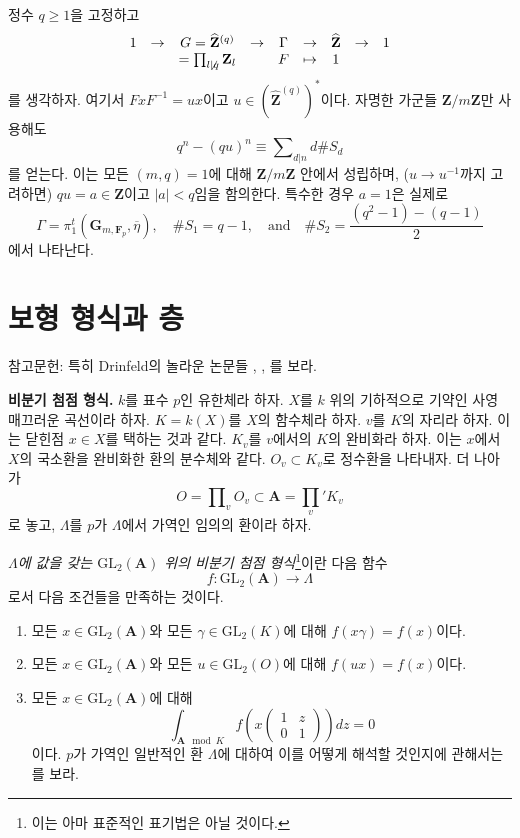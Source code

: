 \begin{example}
\label{example-commutative}
정수 $q\geq 1$을 고정하고
$$
\begin{matrix}
1 &
\to &
G = \widehat{\mathbf{Z}}^{(q)} &
\to &
\Gamma &
\to &
\widehat{\mathbf{Z}} &
\to &
1 \\
&
&
= \prod_{l\not \mid q} \mathbf{Z}_l &
&
F &
\mapsto &
1
\end{matrix}
$$
를 생각하자. 여기서 $FxF^{-1} = ux$이고
$u \in (\widehat{\mathbf{Z}}^{(q)})^*$이다.
자명한 가군들 $\mathbf{Z}/m\mathbf{Z}$만 사용해도
$$
q^n - (qu)^n \equiv \sum\nolimits_{d|n} d\# S_d
$$
를 얻는다. 이는 모든 $(m, q)=1$에 대해 $\mathbf{Z}/m\mathbf{Z}$ 안에서
성립하며, ($u \to u^{-1}$까지 고려하면) $qu = a\in \mathbf{Z}$이고
$|a| < q$임을 함의한다. 특수한 경우 $a = 1$은 실제로
$$
\Gamma = \pi_1^t(\mathbf{G}_{m, \mathbf{F}_p}, \overline \eta),
\quad
\# S_1 = q - 1,
\quad\text{and}\quad
\# S_2 = \frac{(q^2-1)-(q-1)}{2}
$$
에서 나타난다.
\end{example}



\section{보형 형식과 층}
\label{section-automorphic}

\noindent
참고문헌: 특히 Drinfeld의 놀라운 논문들
\cite{D1}, \cite{D2}, \cite{D0}를 보라.

\medskip\noindent
{\bf 비분기 첨점 형식.}
$k$를 표수 $p$인 유한체라 하자.
$X$를 $k$ 위의 기하적으로 기약인 사영 매끄러운 곡선이라 하자.
$K = k(X)$를 $X$의 함수체라 하자.
$v$를 $K$의 자리라 하자. 이는 닫힌점 $x\in X$를 택하는 것과 같다.
$K_v$를 $v$에서의 $K$의 완비화라 하자. 이는 $x$에서 $X$의
국소환을 완비화한 환의 분수체와 같다.
$O_v\subset K_v$로 정수환을 나타내자. 더 나아가
$$
O = \prod\nolimits_v O_v \subset \mathbf{A} = \prod_v' K_v
$$
로 놓고, $\Lambda$를 $p$가 $\Lambda$에서 가역인 임의의 환이라 하자.

\begin{definition}
\label{definition-unramified}
{\it $\Lambda$에 값을 갖는 $\text{GL}_2(\mathbf{A})$ 위의 비분기
첨점 형식}\footnote{이는 아마 표준적인 표기법은 아닐 것이다.}이란
다음 함수
$$
f : \text{GL}_2(\mathbf{A}) \to \Lambda
$$
로서 다음 조건들을 만족하는 것이다.
\begin{enumerate}
\item 모든 $x\in \text{GL}_2(\mathbf{A})$와 모든
$\gamma\in \text{GL}_2(K)$에 대해 $f(x\gamma) = f(x)$이다.
\item 모든 $x\in \text{GL}_2(\mathbf{A})$와 모든
$u\in \text{GL}_2(O)$에 대해 $f(ux) = f(x)$이다.
\item 모든 $x\in \text{GL}_2(\mathbf{A})$에 대해
$$
\int_{\mathbf{A} \mod K} f
\left(x
\left(
\begin{matrix}
1 & z \\
0 & 1
\end{matrix}
\right)
\right) dz = 0
$$
이다. $p$가 가역인 일반적인 환 $\Lambda$에 대하여 이를 어떻게
해석할 것인지에 관해서는 \cite[Section 4.1]{dJ-conjecture}를 보라.
\end{enumerate}
\end{definition}

